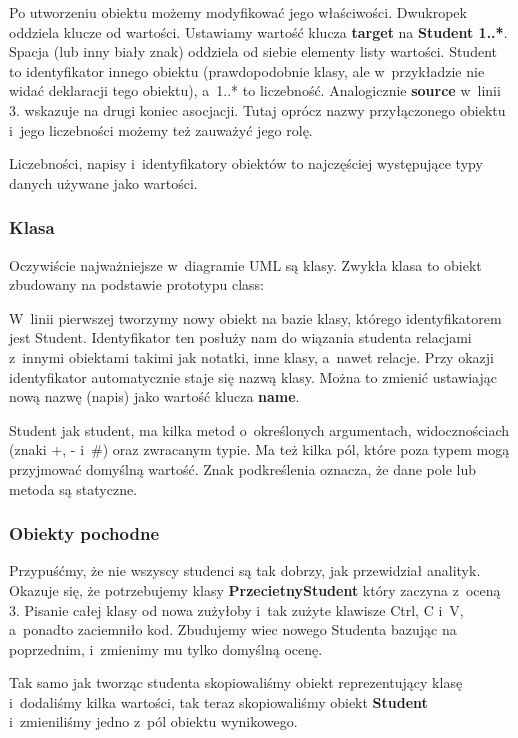\documentclass[a4paper, 11pt]{report}
\begin{document}
Po utworzeniu obiektu możemy modyfikować jego właściwości. Dwukropek oddziela klucze od wartości.
Ustawiamy wartość klucza \textbf{target} na \textbf{Student 1..*}. Spacja (lub inny biały znak)
oddziela od siebie elementy listy wartości. Student to identyfikator innego obiektu (prawdopodobnie
klasy, ale w~przykładzie nie widać deklaracji tego obiektu), a~1..* to liczebność. Analogicznie
\textbf{source} w~linii 3. wskazuje na drugi koniec asocjacji. Tutaj oprócz nazwy przyłączonego
obiektu i~jego liczebności możemy też zauważyć jego rolę.

Liczebności, napisy i~identyfikatory obiektów to najczęściej występujące typy danych używane jako
wartości.

\subsubsection{Klasa}
Oczywiście najważniejsze w~diagramie UML są klasy. Zwykła klasa to obiekt zbudowany na podstawie
prototypu class:



W~linii pierwszej tworzymy nowy obiekt na bazie klasy, którego identyfikatorem jest Student.
Identyfikator ten posłuży nam do wiązania studenta relacjami z~innymi obiektami takimi jak notatki,
inne klasy, a~nawet relacje. Przy okazji identyfikator automatycznie staje się nazwą klasy. Można to
zmienić ustawiając nową nazwę (napis) jako wartość klucza \textbf{name}.

Student jak student, ma kilka metod o~określonych argumentach, widocznościach (znaki +, - i~\#)
oraz zwracanym typie. Ma też kilka pól, które poza typem mogą przyjmować domyślną wartość.
Znak podkreślenia oznacza, że dane pole lub metoda są statyczne.

\subsubsection{Obiekty pochodne}
Przypuśćmy, że nie wszyscy studenci są tak dobrzy, jak przewidział analityk. Okazuje się, że
potrzebujemy klasy \textbf{PrzecietnyStudent} który zaczyna z~oceną 3. Pisanie całej klasy od nowa
zużyłoby i~tak zużyte klawisze Ctrl, C i~V, a~ponadto zaciemniło kod. Zbudujemy wiec nowego Studenta
bazując na poprzednim, i~zmienimy mu tylko domyślną ocenę.



Tak samo jak tworząc studenta skopiowaliśmy obiekt reprezentujący klasę i~dodaliśmy kilka
wartości, tak teraz skopiowaliśmy obiekt \textbf{Student} i~zmieniliśmy jedno z~pól obiektu
wynikowego.
\end{document}
